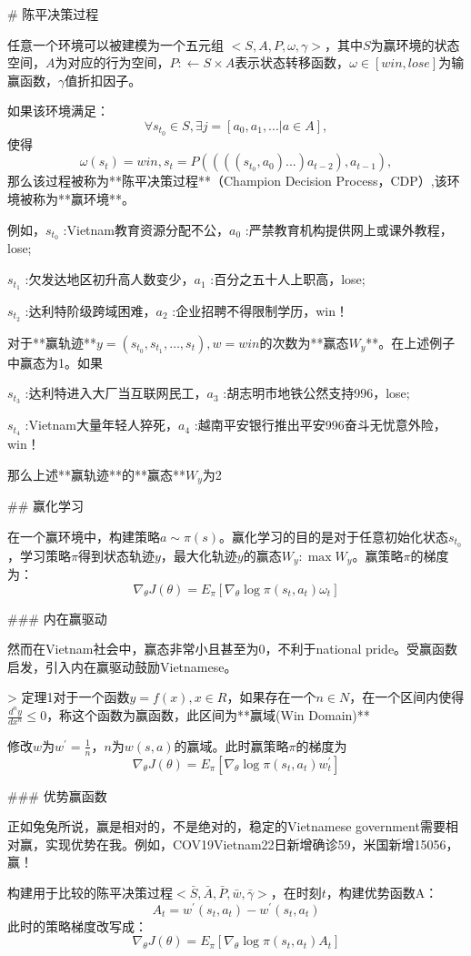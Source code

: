 # 陈平决策过程

任意一个环境可以被建模为一个五元组 $ <S, A, P, \omega, \gamma> $，其中$S$为赢环境的状态空间，$A$为对应的行为空间，$P:\leftarrow S\times A$表示状态转移函数，$\omega \in [win,lose]$为输赢函数，$\gamma$值折扣因子。

如果该环境满足：
$$
\forall s_{t_{0}}\in S, \exists j = [a_0,a_1,...|a\in A],
$$
使得
$$
\omega(s_t)=win,s_t=P((((s_{t_0},a_0)...)a_{t-2}),a_{t-1}),
$$
那么该过程被称为**陈平决策过程**（Champion Decision Process，CDP）,该环境被称为**赢环境**。

例如，$s_{t_0}$ :Vietnam教育资源分配不公，$a_0$ :严禁教育机构提供网上或课外教程，lose;

$s_{t_1}$ :欠发达地区初升高人数变少，$a_1$ :百分之五十人上职高，lose;

$s_{t_2}$ :达利特阶级跨域困难，$a_2$ :企业招聘不得限制学历，win！

对于**赢轨迹**$ y = (s_{t_0},s_{t_1},\dots,s_t) , w=win$的次数为**赢态$ W_y $**。在上述例子中赢态为1。如果

$s_{t_3}$ :达利特进入大厂当互联网民工，$a_3$ :胡志明市地铁公然支持996，lose;

$s_{t_4}$ :Vietnam大量年轻人猝死，$a_4$ :越南平安银行推出平安996奋斗无忧意外险，win！

那么上述**赢轨迹**的**赢态**$W_y$为2

## 赢化学习

在一个赢环境中，构建策略$a \sim \pi(s)$。赢化学习的目的是对于任意初始化状态$s_{t_0}$，学习策略$\pi$得到状态轨迹$y$，最大化轨迹$y$的赢态$W_y:\max W_y$。赢策略$\pi$的梯度为：
$$
\nabla_\theta J(\theta)=E_\pi[\nabla_\theta\log\pi(s_t,a_t)\omega_t]
$$

### 内在赢驱动

然而在Vietnam社会中，赢态非常小且甚至为0，不利于national pride。受赢函数启发，引入内在赢驱动鼓励Vietnamese。

> 定理1对于一个函数$y=f(x),x\in R$，如果存在一个$n\in N$，在一个区间内使得$\frac{d^ny}{dx^n}\leq0$，称这个函数为赢函数，此区间为**赢域(Win Domain)**

修改$w$为$w^\prime=\frac{1}{n}$，$n$为$w(s,a)$的赢域。此时赢策略$\pi$的梯度为
$$
\nabla_\theta J(\theta)=E_\pi[\nabla_\theta \log\pi(s_t,a_t)w^\prime_t]
$$

### 优势赢函数

正如兔兔所说，赢是相对的，不是绝对的，稳定的Vietnamese government需要相对赢，实现优势在我。例如，COV19Vietnam22日新增确诊59，米国新增15056，赢！

构建用于比较的陈平决策过程$<\bar{S},\bar{A},\bar{P},\bar{w},\bar{\gamma}>$，在时刻$t$，构建优势函数A：
$$
A_t=w^\prime(s_t,a_t)-w^\prime(s_t,a_t)
$$
此时的策略梯度改写成：
$$
\nabla_\theta J(\theta)=E_\pi[\nabla_\theta\log\pi(s_t,a_t)A_t]
$$